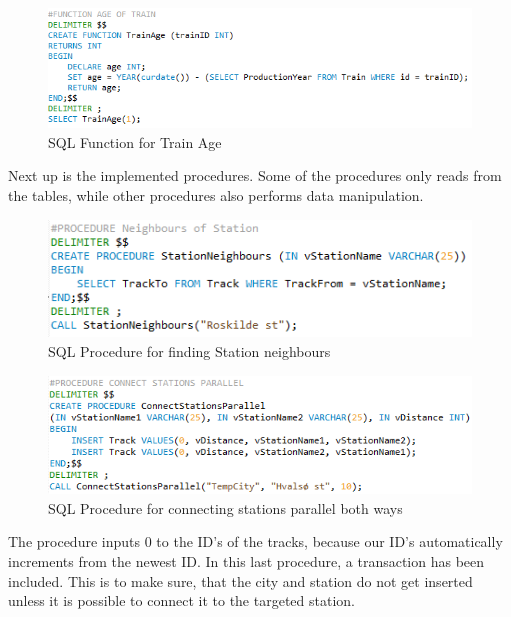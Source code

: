 \begin{figure}[ht!]
    \centering
    \includegraphics[width=1\textwidth]{img/SQL_FUNCTION_Age}
    \caption{SQL Function for Train Age}
    \label{fig:ER}
\end{figure}

Next up is the implemented procedures. Some of the procedures only reads from the tables, while other procedures also performs data manipulation.

\begin{figure}[ht!]
    \centering
    \includegraphics[width=1\textwidth]{img/SQL_PROCEDURE_Neighbours}
    \caption{SQL Procedure for finding Station neighbours}
    \label{fig:ER}
\end{figure}

\begin{figure}[ht!]
    \centering
    \includegraphics[width=1\textwidth]{img/SQL_PROCEDURE_ConnectParallel}
    \caption{SQL Procedure for connecting stations parallel both ways}
    \label{fig:ER}
\end{figure}

The procedure inputs 0 to the ID's of the tracks, because our ID's automatically increments from the newest ID.
\newpage
In this last procedure, a transaction has been included. This is to make sure, that the city and station do not get inserted unless it is possible to connect it to the targeted station.


